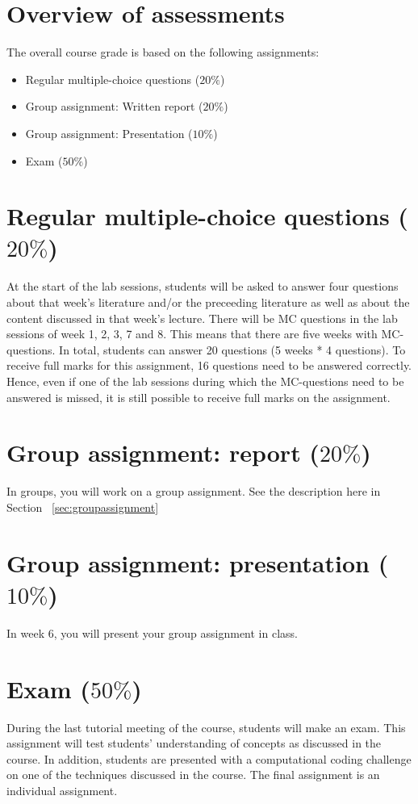 \documentclass[a4paper,10pt]{report}
\begin{document}
\section{Overview of assessments}
The overall course grade is based on the following assignments:
\begin{itemize}
	\item Regular multiple-choice questions (\(20\%\))
	\item Group assignment: Written report (\(20\%\))
	\item Group assignment: Presentation (\(10\%\))
	\item Exam (\(50\%\))
\end{itemize}

\section{Regular multiple-choice questions ($20\%$)}
At the start of the lab sessions, students will be asked to answer four questions about that week's literature and/or the preceeding literature as well as about the content discussed in that week's lecture. There will be MC questions in the lab sessions of week 1, 2, 3, 7 and 8. This means that there are five weeks with MC-questions. In total, students can answer 20 questions (5 weeks * 4 questions). To receive full marks for this assignment, 16 questions need to be answered correctly. Hence, even if one of the lab sessions during which the MC-questions need to be answered is missed, it is still possible to receive full marks on the assignment.
	
\section{Group assignment: report ($20\%$)}
In groups, you will work on a group assignment. See the description here in Section ~\ref{sec:groupassignment}

\section{Group assignment: presentation ($10\%$)}
In week 6, you will present your group assignment in class. 

\section{Exam ($50\%$)}
During the last tutorial meeting of the course, students will make an exam. This assignment will test students' understanding of concepts as discussed in the course. In addition, students are presented with a computational coding challenge on one of the techniques discussed in the course. The final assignment is an individual assignment. 
\end{document}
